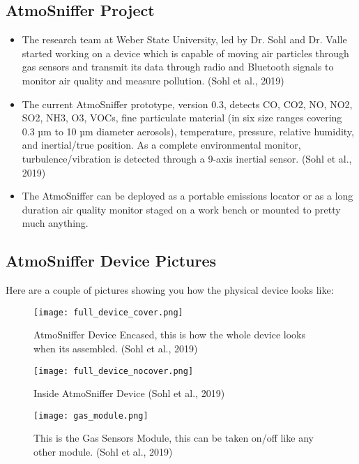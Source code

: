 \subsection{AtmoSniffer Project}
\begin{itemize}
\item The research team at Weber State University, led by Dr. Sohl and Dr. Valle started working on a device which is capable of moving air particles through gas sensors and transmit its data through radio and Bluetooth signals to monitor air quality and measure pollution. (Sohl et al., 2019)

\item The current AtmoSniffer prototype, version 0.3, detects CO, CO2, NO, NO2, SO2, NH3, O3, VOCs, fine particulate material (in six size ranges covering 0.3 µm to 10 µm diameter aerosols), temperature, pressure, relative humidity, and inertial/true position. As a complete environmental monitor, turbulence/vibration is detected through a 9-axis inertial sensor. (Sohl et al., 2019)

\item The AtmoSniffer can be deployed as a portable emissions locator or as a long duration air quality monitor staged on a work bench or mounted to pretty much anything.
\end{itemize}

\subsection{AtmoSniffer Device Pictures}
Here are a couple of pictures showing you how the physical device looks like:

\begin{figure}[h]
\centering
\texttt{[image: full\_device\_cover.png]}
 \caption{AtmoSniffer Device Encased, this is how the whole device looks when its assembled. (Sohl et al., 2019)}
 \label{fig:encased_device}
\end{figure}

\begin{figure}[h]
\centering
\texttt{[image: full\_device\_nocover.png]}
 \caption{Inside AtmoSniffer Device (Sohl et al., 2019)}
 \label{fig:inside_device}
\end{figure}

\begin{figure}[h]
\centering
\texttt{[image: gas\_module.png]}
 \caption{This is the Gas Sensors Module, this can be taken on/off like any other module. (Sohl et al., 2019)}
 \label{fig:gas_sensors}
\end{figure}

